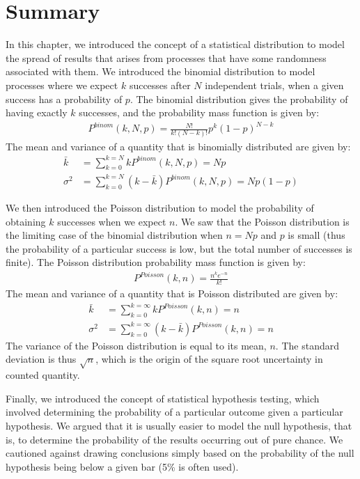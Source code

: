 \section{Summary}
In this chapter, we introduced the concept of a statistical distribution to model the spread of results that arises from processes that have some randomness associated with them. We introduced the binomial distribution to model processes where we expect $k$ successes after $N$ independent trials, when a given success has a probability of $p$. The binomial distribution gives the probability of having exactly $k$ successes, and the probability mass function is given by:
\begin{align}
P^{binom}(k,N,p)=\frac{N!}{k!(N-k)!}p^k(1-p)^{N-k}
\end{align}
The mean and variance of a quantity that is binomially distributed are given by:
\begin{align}
\bar k &= \sum_{k=0}^{k=N}kP^{binom}(k,N,p)=Np\\
\sigma^2 &= \sum_{k=0}^{k=N}(k-\bar k)P^{binom}(k,N,p)=Np(1-p)
\end{align}

We then introduced the Poisson distribution to model the probability of obtaining $k$ successes when we expect $n$. We saw that the Poisson distribution is the limiting case of the binomial distribution when $n=Np$ and $p$ is small (thus the probability of a particular success is low, but the total number of successes is finite). The Poisson distribution probability mass function is given by:
\begin{align*}
 P^{Poisson}(k,n)=\frac{n^k e^{-n}}{k!} 
\end{align*}  
The mean and variance of a quantity that is Poisson distributed are given by:
\begin{align}
\bar k &= \sum_{k=0}^{k=\infty}kP^{Poisson}(k,n)=n\\
\sigma^2 &= \sum_{k=0}^{k=\infty}(k-\bar k)P^{Poisson}(k,n)=n
\end{align}
The variance of the Poisson distribution is equal to its mean, $n$. The standard deviation is thus $\sqrt{n}$, which is the origin of the square root uncertainty in counted quantity.

Finally, we introduced the concept of statistical hypothesis testing, which involved determining the probability of a particular outcome given a particular hypothesis. We argued that it is usually easier to model the null hypothesis, that is, to determine the probability of the results occurring out of pure chance. We cautioned against drawing conclusions simply based on the probability of the null hypothesis being below a given bar (5\% is often used). 